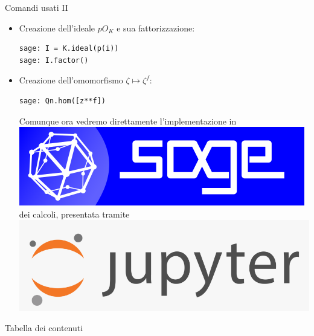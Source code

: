 \documentclass[handout]{beamer}
\theoremstyle{plain}
\theoremstyle{remark}
\theoremstyle{definition}
\newcommand{\sage}{\href{https://www.sagemath.org}{\includegraphics[height=\fontcharht\font`\B]{../images/sage.png} }}
\newcommand{\jupyter}{\href{https://www.sagemath.org}{\includegraphics[height=\fontcharht\font`\B]{../images/jupyter.png} }}
\begin{document}
\begin{frame}[fragile]{Comandi usati II}

\begin{itemize}
\item Creazione dell'ideale $ pO_K $ e sua fattorizzazione:
\begin{lstlisting}
sage: I = K.ideal(p(i))
sage: I.factor()
\end{lstlisting}

\item Creazione dell'omomorfismo $ \zeta \mapsto \zeta^f $:
\begin{lstlisting}
sage: Qn.hom([z**f])
\end{lstlisting}

\pause 
Comunque ora vedremo direttamente l'implementazione in \sage dei calcoli, presentata tramite \jupyter


\end{itemize}	
\end{frame}

	\begin{frame}[allowframebreaks]{Tabella dei contenuti}
		\tableofcontents
	\end{frame}
	
	

	
	
	
	
	
\end{document}
